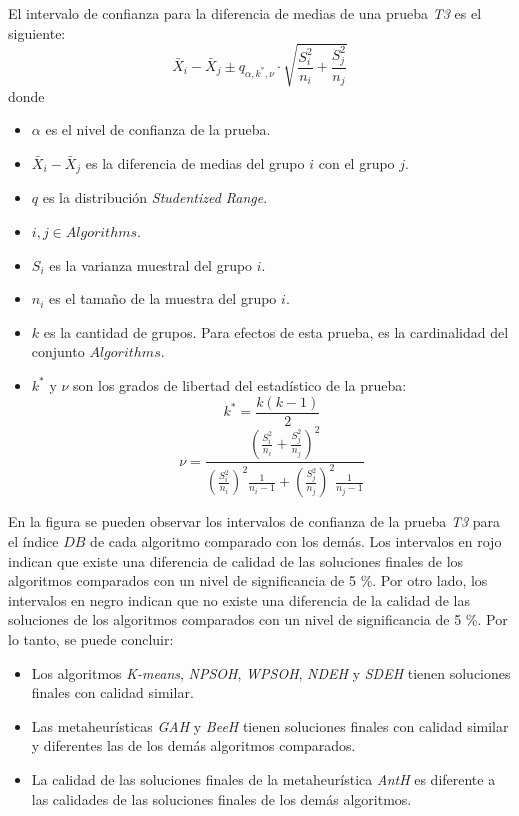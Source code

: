     El intervalo de confianza para la diferencia de medias de una prueba
\emph{T3} es el siguiente:
\begin{equation}\label{dtk_inter}
    \bar{X}_i - \bar{X}_j \pm q_{\alpha, k^{*}, \nu} \cdot \sqrt{\displaystyle\frac{S_{i}^2}{n_i} + \displaystyle\frac{S_{j}^2}{n_j}}
\end{equation}
donde
\begin{itemize}
    \item $\alpha$ es el nivel de confianza de la prueba.
    \item $\bar{X}_i - \bar{X}_j$ es la diferencia de medias del grupo $i$ con
el grupo $j$.
    \item $q$ es la distribución \emph{Studentized Range}.
    \item $i, j \in Algorithms$.
    \item $S_i$ es la varianza muestral del grupo $i$.
    \item $n_i$ es el tamaño de la muestra del grupo $i$.
    \item $k$ es la cantidad de grupos. Para efectos de esta prueba, es la
          cardinalidad del conjunto $Algorithms$.
    \item $k^{*}$ y $\nu$ son los grados de libertad del estadístico de la prueba:
          \begin{equation}
                k^{*} = \displaystyle\frac{k (k - 1)}{2}
          \end{equation}
          \begin{equation}\label{eq: nu}
            \nu = \displaystyle\frac{\left(\displaystyle\frac{S_{i}^2}{n_i} + \displaystyle\frac{S_{j}^2}{n_j}\right)^2}{\left(\displaystyle\frac{S_{i}^2}{n_i}\right)^2 \displaystyle\frac{1}{n_i - 1} + \left(\displaystyle\frac{S_{j}^2}{n_j}\right)^2 \displaystyle\frac{1}{n_j - 1}}
          \end{equation}
\end{itemize}

    En la figura  se pueden observar los intervalos de
confianza de la prueba \emph{T3} para el índice $DB$ de cada algoritmo comparado
con los demás. Los intervalos en rojo indican que existe una diferencia de calidad
de las soluciones finales de los algoritmos comparados con un nivel de significancia
de 5 \%. Por otro lado, los intervalos en negro indican que no existe una diferencia
de la calidad de las soluciones de los algoritmos comparados con un nivel de 
significancia de 5 \%. Por lo tanto, se puede concluir:
\begin{itemize}
    \item Los algoritmos \emph{K-means}, \emph{NPSOH}, \emph{WPSOH}, \emph{NDEH}
          y \emph{SDEH} tienen soluciones finales con calidad similar.
    \item Las metaheurísticas \emph{GAH} y \emph{BeeH} tienen soluciones finales
          con calidad similar y diferentes las de los demás algoritmos
          comparados.
    \item La calidad de las soluciones finales de la metaheurística \emph{AntH}
          es diferente a las calidades de las soluciones finales de los demás
          algoritmos.
\end{itemize}

